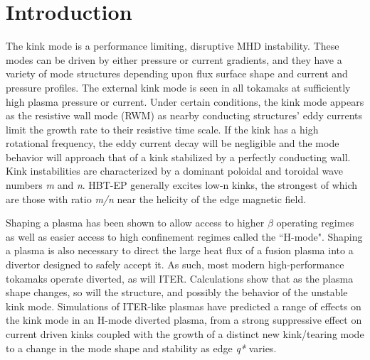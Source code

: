 \documentclass[aps,preprint,showpacs,superscriptaddress,groupedaddress]{revtex4}  %
\begin{document}
\section{Introduction}
The kink mode is a performance limiting, disruptive MHD instability\cite{Strait}.  These modes can be driven by either pressure or current gradients, and they have a variety of mode structures depending upon flux surface shape and current and pressure profiles.  The external kink mode is seen in all tokamaks at sufficiently high plasma pressure or current.  Under certain conditions, the kink mode appears as the resistive wall mode (RWM) as nearby conducting structures' eddy currents limit the growth rate to their resistive time scale.  If the kink has a high rotational frequency, the eddy current decay will be negligible and the mode behavior will approach that of a kink stabilized by a perfectly conducting wall.  Kink instabilities are characterized by a dominant poloidal and toroidal wave numbers \textit{m} and \textit{n}.  HBT-EP generally excites low-n kinks, the strongest of which are those with ratio \textit{m/n} near the helicity of the edge magnetic field.\par
	Shaping a plasma has been shown to allow access to higher $\beta$ operating regimes as well as easier access to high confinement regimes called the ``H-mode"\citep{Lazarus, Keilhacker_HMode}. Shaping a plasma is also necessary to direct the large heat flux of a fusion plasma into a divertor designed to safely accept it.  As such, most modern high-performance tokamaks operate diverted, as will ITER\citep{Aymar}.  Calculations show that as the plasma shape changes, so will the structure, and possibly the behavior of the unstable kink mode.\citep{Wesson,Lao}  Simulations of ITER-like plasmas have predicted a range of effects on the kink mode in an H-mode diverted plasma, from a strong suppressive effect on current driven kinks coupled with the growth of a distinct new kink/tearing mode\cite{Huysmans} to a change in the mode shape and stability as edge \textit{q*} varies\cite{Maurer}.\par
\end{document}
